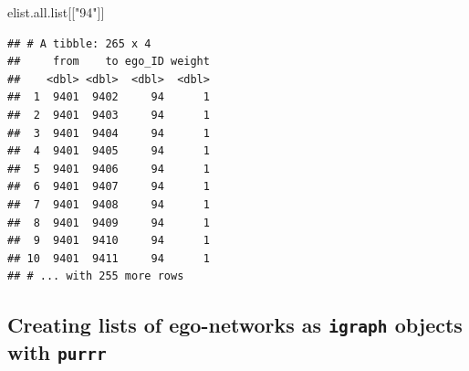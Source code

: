 \documentclass[
]{book}
\newenvironment{Shaded}{\begin{snugshade}}{\end{snugshade}}
\newcommand{\NormalTok}[1]{#1}
\newcommand{\StringTok}[1]{\textcolor[rgb]{0.31,0.60,0.02}{#1}}
\begin{document}
\begin{Shaded}
\begin{Highlighting}[]
\NormalTok{elist.all.list[[}\StringTok{"94"}\NormalTok{]]}
\end{Highlighting}
\end{Shaded}

\begin{verbatim}
## # A tibble: 265 x 4
##     from    to ego_ID weight
##    <dbl> <dbl>  <dbl>  <dbl>
##  1  9401  9402     94      1
##  2  9401  9403     94      1
##  3  9401  9404     94      1
##  4  9401  9405     94      1
##  5  9401  9406     94      1
##  6  9401  9407     94      1
##  7  9401  9408     94      1
##  8  9401  9409     94      1
##  9  9401  9410     94      1
## 10  9401  9411     94      1
## # ... with 255 more rows
\end{verbatim}

\hypertarget{creating-lists-of-ego-networks-as-igraph-objects-with-purrr}{%
\subsection{\texorpdfstring{Creating lists of ego-networks as \texttt{igraph} objects with \texttt{purrr}}{Creating lists of ego-networks as igraph objects with purrr}}\label{creating-lists-of-ego-networks-as-igraph-objects-with-purrr}}
\end{document}
